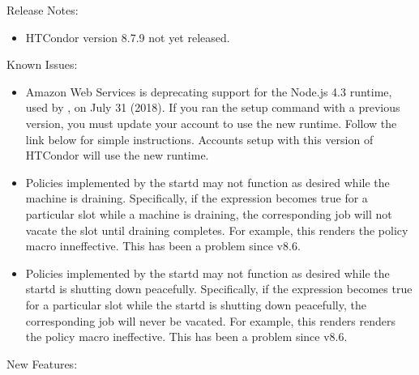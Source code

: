 \noindent Release Notes:

\begin{itemize}

\item HTCondor version 8.7.9 not yet released.

\end{itemize}


\noindent Known Issues:

\begin{itemize}

\item Amazon Web Services is deprecating support for the Node.js 4.3 runtime,
used by , on July 31 (2018).  If you ran the  setup
command with a previous version, you must update your account to use the new
runtime.  Follow the link below for simple instructions.  Accounts setup with
this version of HTCondor will use the new runtime.

\item Policies implemented by the startd may not function as desired while
the machine is draining.  Specifically, if the  expression
becomes true for a particular slot while a machine is draining, the
corresponding job will not vacate the slot until draining completes.  For
example, this renders the policy macro 
inneffective.  This has been a problem since v8.6.

\item Policies implemented by the startd may not function as desired while
the startd is shutting down peacefully.  Specifically, if the 
expression becomes true for a particular slot while the startd is shutting
down peacefully, the corresponding job will never be vacated.  For example,
this renders renders the policy macro 
ineffective.  This has been a problem since v8.6.

\end{itemize}


\noindent New Features:

